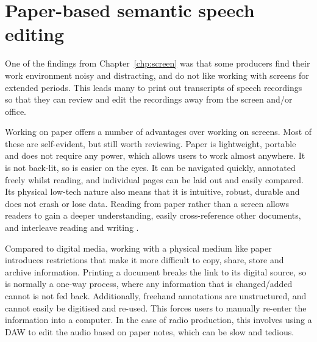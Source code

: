 \chapter{Paper-based semantic speech editing}\label{chp:paper}

One of the findings from Chapter~\ref{chp:screen} was that some producers find their work environment noisy and
distracting, and do not like working with screens for extended periods. This leads many to print out transcripts of
speech recordings so that they can review and edit the recordings away from the screen and/or office.

Working on paper offers a number of advantages over working on screens. Most of these are self-evident, but still
worth reviewing.  Paper is lightweight, portable and does not require any power, which allows users to work almost
anywhere.  It is not back-lit, so is easier on the eyes.  It can be navigated quickly, annotated freely whilst reading,
and individual pages can be laid out and easily compared.  Its physical low-tech nature also means that it is
intuitive, robust, durable and does not crash or lose data.  Reading from paper rather than a screen allows readers to
gain a deeper understanding, easily cross-reference other documents, and interleave reading and writing
\citep{OHara1997, Mangen2013, Singer2017}.



Compared to digital media, working with a physical medium like paper introduces restrictions that make it more
difficult to copy, share, store and archive information. Printing a document breaks the link to its digital source, so
is normally a one-way process, where any information that is changed/added cannot is not fed back. Additionally,
freehand annotations are unstructured, and cannot easily be digitised and re-used. This forces users to manually
re-enter the information into a computer. In the case of radio production, this involves using a DAW to edit the audio
based on paper notes, which can be slow and tedious.


